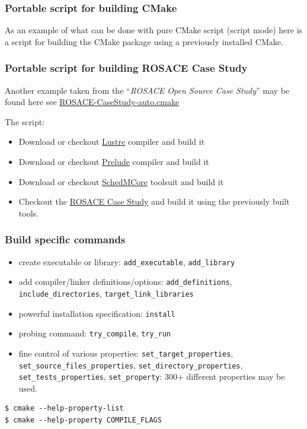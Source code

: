 \documentclass[compress,slidestop,table,usepdftitle=false
              ]
               {beamer}
\begin{document}
\begin{frame}
\frametitle{Portable script for building CMake}
As an example of what can be done with pure CMake script
(script mode) here is a script for building the CMake package
using a previously installed CMake.


\end{frame}

\begin{frame}[fragile]
  \frametitle{Portable script for building ROSACE Case Study}
Another example taken from the ``\emph{ROSACE Open Source Case Study}'' may be found here
see \href{https://svn.onera.fr/schedmcore/branches/ROSACE_CaseStudy/prelude_implementations/instructions/ROSACE-CaseStudy-auto.cmake}{ROSACE-CaseStudy-auto.cmake}

The script:
\begin{itemize}
\item Download or checkout \href{https://cavale.enseeiht.fr/redmine/projects/lustrec}{Lustre} compiler and build it
\item Download or checkout \href{https://forge.onera.fr/projects/prelude}{Prelude} compiler and build it
\item Download or checkout \href{http://sites.onera.fr/schedmcore/}{SchedMCore} toolsuit and build it
\item Checkout the \href{http://sites.onera.fr/schedmcore/ROSACE}{ROSACE Case Study} and build it using the previously built tools.
\end{itemize}
\end{frame}

\begin{frame}[fragile]
\frametitle{Build specific commands}
\begin{itemize}
\item create executable or library: \lstinline!add_executable!, \lstinline!add_library!
\item add compiler/linker definitions/options: \lstinline!add_definitions!, \lstinline!include_directories!,
      \lstinline!target_link_libraries!
\item powerful installation specification: \lstinline!install!
\item probing command: \lstinline!try_compile!, \lstinline!try_run!
\item fine control of various properties:
      \lstinline!set_target_properties!,
      \lstinline!set_source_files_properties!,
      \lstinline!set_directory_properties!,
      \lstinline!set_tests_properties!, \lstinline!set_property!: \alert{300+} different properties may be used.
\end{itemize}
\begin{Verbatim}
$ cmake --help-property-list
$ cmake --help-property COMPILE_FLAGS
\end{Verbatim}
\end{frame}
\end{document}

